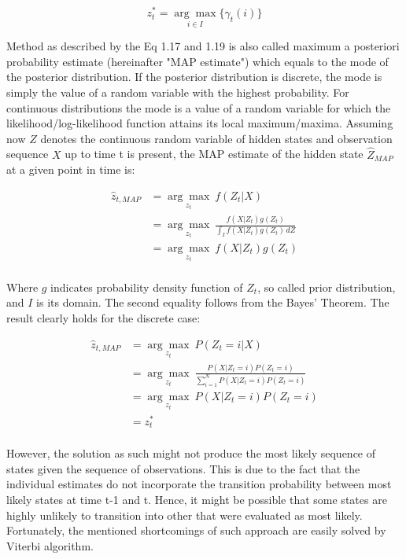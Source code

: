 \begin{equation}
z_t^* = \underset{i \in I}{\arg\max} \{\gamma_t(i)\}
\end{equation}

Method as described by the Eq 1.17 and 1.19 is also called maximum a posteriori probability estimate (hereinafter "MAP estimate") which equals to the mode of the posterior distribution. If the posterior distribution is discrete, the mode is simply the value of a random variable with the highest probability. For continuous distributions the mode is a value of a random variable for which the likelihood/log-likelihood function attains its local maximum/maxima. Assuming now $Z$ denotes the continuous random variable of hidden states and observation sequence $X$ up to time t is present, the MAP estimate of the hidden state $\hat{Z}_{MAP}$ at a given point in time is:

\begin{align}
\hat{z}_{t,MAP} &= \underset{z_t}{\arg\max} \: f(Z_t|X) \\ \nonumber
&= \underset{z_t}{\arg\max} \: \frac{f(X|Z_t)g(Z_t)}{\int_{I} f(X|Z_t)g(Z_t) \,dZ} \\ \nonumber
&= \underset{z_t}{\arg\max} \: f(X|Z_t)g(Z_t)\\ \nonumber
\end{align}

Where $g$ indicates probability density function of $Z_t$, so called prior distribution, and $I$ is its domain. The second equality follows from the Bayes' Theorem. The result clearly holds for the discrete case:

\begin{align}
\hat{z}_{t,MAP} &= \underset{z_t}{\arg\max} \: P(Z_t=i|X) \\ \nonumber
&= \underset{z_t}{\arg\max} \: \frac{P(X|Z_t=i)P(Z_t=i)}{\sum_{i=1}^N P(X|Z_t=i)P(Z_t=i)} \\ \nonumber
&= \underset{z_t}{\arg\max} \:P(X|Z_t=i)P(Z_t=i)\\ \nonumber
&= z_t^*\\ \nonumber
\end{align}

However, the solution as such might not produce the most likely sequence of states given the sequence of observations. This is due to the fact that the individual estimates do not incorporate the transition probability between most likely states at time t-1 and t. Hence, it might be possible that some states are highly unlikely to transition into other that were evaluated as most likely. Fortunately, the mentioned shortcomings of such approach are easily solved by Viterbi algorithm.

